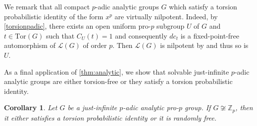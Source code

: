 \documentclass[a4paper,10pt]{amsart}
\theoremstyle{plain}
\newtheorem{corollary}[thm]{Corollary}
\theoremstyle{definition}
\newcommand{\bbZ}{\mathbb{Z}}
\numberwithin{equation}{section}
\begin{document}
We remark that all compact $p$-adic analytic groups $G$ which satisfy a torsion probabilistic identity of the form $x^p$ are virtually nilpotent. Indeed, by \cref{torsionpadic}, there exists an open uniform pro-$p$ subgroup $U$ of $G$ and $t \in \mathrm{Tor}(G)$ such that $C_U(t) = 1$ and consequently $dc_t$ is a fixed-point-free automorphism of $\mathcal L(G)$ of order $p$. Then $\mathcal L(G)$ is nilpotent by \cite[Theorem 3]{Z89} and thus so is $U$. 

As a final application of \cref{thm:analytic}, we show that solvable just-infinite $p$-adic analytic groups are either torsion-free or they satisfy a torsion probabilistic identity.
\begin{corollary}
Let $G$ be a just-infinite $p$-adic analytic pro-$p$ group. If $G \not\cong \bbZ_p$, then it either satisfies a torsion probabilistic identity or it is randomly free.
\end{corollary}
\end{document}
